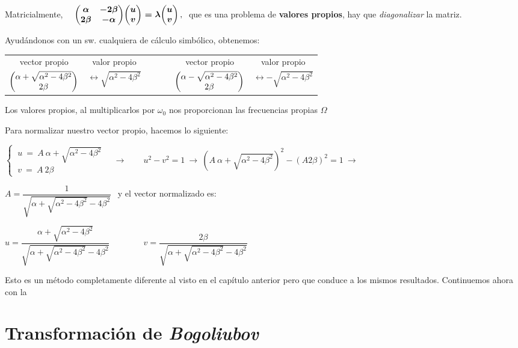 Matricialmente, $\quad \boldsymbol{ \mqty(\alpha & -2\beta \\ 2\beta & -\alpha) \mqty(u\\v) = \lambda \mqty(u\\v) } \, , \ $  que es una problema de \textbf{valores propios}, hay que \emph{diagonalizar} la matriz.

Ayudándonos con un sw. cualquiera de cálculo simbólico, obtenemos:

\begin{table}[H]
\centering
\begin{tabular}{lllll}
\multicolumn{1}{c}{vector propio} & \multicolumn{1}{c}{valor propio} & \multicolumn{1}{c}{$\qquad$} & \multicolumn{1}{c}{vector propio} & \multicolumn{1}{c}{valor propio} \\
$\mqty(\alpha+\sqrt{\alpha^2-4\beta^2}\\2\beta)$ & $\leftrightarrow \sqrt{\alpha^2-4\beta^2}$ &  & $\mqty(\alpha-\sqrt{\alpha^2-4\beta^2}\\2\beta)$ & $\leftrightarrow -\sqrt{\alpha^2-4\beta^2}$
\end{tabular}
\end{table}

Los valores propios, al multiplicarlos por $\omega_0$ nos proporcionan las frecuencias propias $\Omega$

Para normalizar nuestro vector propio, hacemos lo siguiente:

$\begin{cases} \ u\ = \  A\ \alpha+\sqrt{\alpha^2-4\beta^2} \\ \ v \ = \ A \  2\beta \end{cases} \quad \to \qquad u^2-v^2=1 \ \to \ (A\ \alpha+\sqrt{\alpha^2-4\beta^2})^2-(A 2\beta)^2=1 \ \to \ $

$A=\dfrac{1}{ \sqrt{  \alpha+\sqrt{\alpha^2-4\beta^2} - 4\beta^2} }\ \ $ y el
 vector normalizado es:
 
 $u= \dfrac{\alpha+\sqrt{\alpha^2-4\beta^2}}{ \sqrt{  \alpha+\sqrt{\alpha^2-4\beta^2} - 4\beta^2} } \qquad \qquad v= 
 \dfrac{2\beta}{ \sqrt{  \alpha+\sqrt{\alpha^2-4\beta^2} - 4\beta^2} }$
 
 \vspace{5mm} Esto es un método completamente diferente al visto en el capítulo anterior pero que conduce a los mismos resultados. Continuemos ahora con la 

 \vspace{5mm} 
\section{Transformación de \emph{Bogoliubov}}


